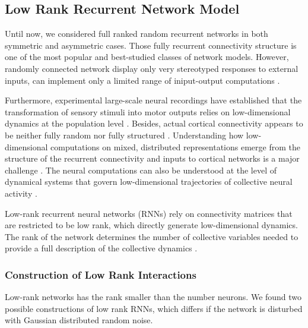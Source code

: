 \documentclass[11pt]{article}
\begin{document}
	\clearpage
	\subsection{Low Rank Recurrent Network Model}
	Until now, we considered full ranked random recurrent networks in both symmetric and asymmetric cases. Those fully recurrent connectivity structure is one of the most popular and best-studied classes of network models. However, randomly connected network display only very stereotyped responses to external inputs, can implement only a limited range of iniput-output computations \cite{mastrogiuseppe2018linking}. 
	
	Furthermore, experimental large-scale neural recordings have established that the transformation of sensory stimuli into motor outputs relies on low-dimensional dynamics at the population level \cite{mastrogiuseppe2018linking}. Besides, actual cortical connectivity appears to be neither fully random nor fully structured \cite{harris2013cortical}. Understanding how low-dimensional computations on mixed, distributed representations emerge from the structure of the recurrent connectivity and inputs to cortical networks is a major challenge \cite{mastrogiuseppe2018linking}. The neural computations can also be understood at the level of dynamical systems that govern low-dimensional trajectories of collective neural activity \cite{beiran2021shaping}. 
	
	Low-rank recurrent neural networks (RNNs) rely on connectivity matrices that are restricted to be low rank, which directly generate low-dimensional dynamics. The rank of the network determines the number of collective variables needed to provide a full description of the collective dynamics \cite{beiran2021shaping}. 
	
	\subsubsection{Construction of Low Rank Interactions} \label{sec:low_rank_construct}
	Low-rank networks has the rank smaller than the number neurons. We found two possible constructions of low rank RNNs, which differs if the network is disturbed with Gaussian distributed random noise. 
\end{document}
